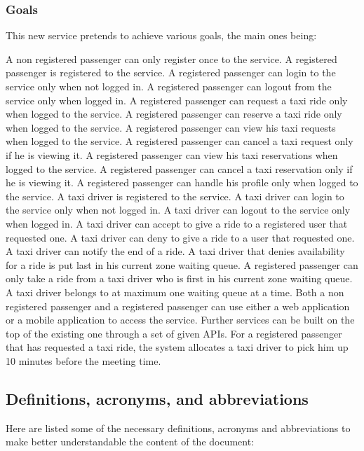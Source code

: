 \subsubsection{Goals}
This new service pretends to achieve various goals, the main ones being:
\begin{itemize}
	 A non registered passenger can only register once to the service.
	 A registered passenger is registered to the service.
	 A registered passenger can login to the service only when not logged in.
	 A registered passenger can logout from the service only when logged in.
	 A registered passenger can request a taxi ride only when logged to the service.
	 A registered passenger can reserve a taxi ride only when logged to the service.
	 A registered passenger can view his taxi requests when logged to the service.
	 A registered passenger can cancel a taxi request only if he is viewing it.
	 A registered passenger can view his taxi reservations when logged to the service.
	 A registered passenger can cancel a taxi reservation only if he is viewing it.
	 A registered passenger can handle his profile only when logged to the service.
	 A taxi driver is registered to the service.
	 A taxi driver can login to the service only when not logged in.
	 A taxi driver can logout to the service only when logged in.
	 A taxi driver can accept to give a ride to a registered user that requested one.
	 A taxi driver can deny to give a ride to a user that requested one.
	 A taxi driver can notify the end of a ride.
	 A taxi driver that denies availability for a ride is put last in his current zone waiting queue.
	 A registered passenger can only take a ride from a taxi driver who is first in his current zone waiting queue.
	 A taxi driver belongs to at maximum one waiting queue at a time.
	 Both a non registered passenger and a registered passenger can use either a web application or a mobile application to access the service.
	 Further services can be built on the top of the existing one through a set of given APIs.
	 For a registered passenger that has requested a taxi ride, the system allocates a taxi driver to pick him up 10 minutes before the meeting time.
\end{itemize}
\subsection{Definitions, acronyms, and abbreviations}
Here are listed some of the necessary definitions, acronyms and abbreviations to make better understandable the content of the document:
